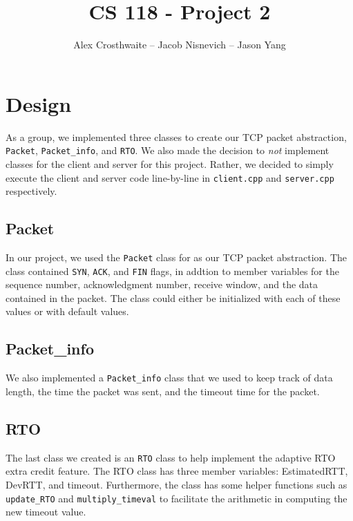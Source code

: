 \documentclass{article}
\begin{document}
\title{CS 118 - Project 2}
\author{Alex Crosthwaite -- Jacob Nisnevich -- Jason Yang}

\maketitle

\section{Design}

As a group, we implemented three classes to create our TCP packet abstraction, \texttt{Packet}, \texttt{Packet\_info}, and \texttt{RTO}. We also made the decision to \textit{not} implement classes for the client and server for this project. Rather, we decided to simply execute the client and server code line-by-line in \texttt{client.cpp} and \texttt{server.cpp} respectively.

\subsection{Packet}

In our project, we used the \texttt{Packet} class for as our TCP packet abstraction. The class contained \texttt{SYN}, \texttt{ACK}, and \texttt{FIN} flags, in addtion to member variables for the sequence number, acknowledgment number, receive window, and the data contained in the packet. The class could either be initialized with each of these values or with default values.

\subsection{Packet\_info}

We also implemented a \texttt{Packet\_info} class that we used to keep track of data length, the time the packet was sent, and the timeout time for the packet.

\subsection{RTO}

The last class we created is an \texttt{RTO} class to help implement the adaptive RTO extra credit feature. The RTO class has three member variables: EstimatedRTT, DevRTT, and timeout. Furthermore, the class has some helper functions such as \texttt{update\_RTO} and \texttt{multiply\_timeval} to facilitate the arithmetic in computing the new timeout value.
\end{document}
